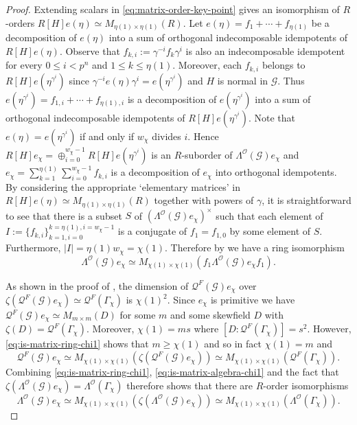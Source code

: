 \documentclass[12pt]{amsart}
\theoremstyle{plain}
\theoremstyle{remark}
\theoremstyle{definition}
\numberwithin{equation}{section}
\begin{document}
\begin{proof}
Extending scalars in \eqref{eq:matrix-order-key-point} gives an isomorphism of $R$-orders $R[H]e(\eta) \simeq M_{\eta(1) \times \eta(1)}(R)$.
Let $e(\eta) = f_{1} + \cdots + f_{\eta(1)}$ be a decomposition of $e(\eta)$
into a sum of orthogonal indecomposable idempotents of $R[H]e(\eta)$.
Observe that $f_{k,i}:=\gamma^{-i}f_{k}\gamma^{i}$ is also an indecomposable idempotent
for every $0 \leq i < p^{n}$ and $1 \leq k \leq \eta(1)$.
Moreover, each $f_{k,i}$ belongs to $R[H]e(\eta^{\gamma^{i}})$ since
$\gamma^{-i}e(\eta)\gamma^{i}=e(\eta^{\gamma^{i}})$ and $H$ is normal in $\mathcal{G}$.
Thus $e(\eta^{\gamma^{i}}) = f_{1,i} + \cdots + f_{\eta(1),i}$ is a decomposition of $e(\eta^{\gamma^{i}})$
into a sum of orthogonal indecomposable idempotents of $R[H]e(\eta^{\gamma^{i}})$.
Note that $e(\eta) = e(\eta^{\gamma^{i}})$ if and only if  $w_{\chi}$ divides $i$.
Hence $R[H]e_{\chi} = \oplus_{i=0}^{w_{\chi}-1} R[H] e(\eta^{\gamma^{i}})$ is an $R$-suborder of
$\Lambda^{\mathcal{O}}(\mathcal{G})e_{\chi}$ and $e_{\chi} = \sum_{k=1}^{\eta(1)} \sum_{i=0}^{w_{\chi}-1} f_{k,i}$
is a decomposition of $e_{\chi}$ into orthogonal idempotents.
By considering the appropriate `elementary matrices' in $R[H]e(\eta) \simeq  M_{\eta(1) \times \eta(1)}(R)$
together with powers of $\gamma$, it is straightforward to see that there is a subset $S$ of
$(\Lambda^{\mathcal{O}}(\mathcal{G})e_{\chi})^{\times}$
such that each element of $I:=\{ f_{k,i} \}_{k=1,i=0}^{k=\eta(1), i=w_{\chi}-1}$ is a conjugate of $f_{1}=f_{1,0}$
by some element of $S$. Furthermore, $|I|=\eta(1)w_{\chi}=\chi(1)$.
Therefore by \cite[\S 46, Exercise 2]{MR892316} we have a ring isomorphism
\begin{equation}\label{eq:is-matrix-ring-chi1}
\Lambda^{\mathcal{O}}(\mathcal{G})e_{\chi} \simeq M_{\chi(1) \times \chi(1)}(f_{1}\Lambda^{\mathcal{O}}(\mathcal{G})e_{\chi}f_{1}).
\end{equation}

As shown in the proof of \cite[Proposition 6 (2)]{MR2114937},
the dimension of $\mathcal{Q}^{F}(\mathcal{G})e_{\chi}$ over
$\zeta(\mathcal{Q}^{F}(\mathcal{G})e_{\chi}) \simeq \mathcal{Q}^{F}(\Gamma_{\chi})$ is $\chi(1)^{2}$.
Since $e_{\chi}$ is primitive we have $\mathcal{Q}^{F}(\mathcal{G})e_{\chi} \simeq M_{m \times m}(D)$ for some $m$ and some skewfield $D$
with $\zeta(D)=\mathcal{Q}^{F}(\Gamma_{\chi})$.
Moreover, $\chi(1)=ms$ where $[D: \mathcal{Q}^{F}(\Gamma_{\chi})]=s^{2}$.
However, \eqref{eq:is-matrix-ring-chi1} shows that $m \geq \chi(1)$ and so in fact $\chi(1)=m$
and
\begin{equation}\label{eq:is-matrix-algebra-chi1}
\mathcal{Q}^{F}(\mathcal{G})e_{\chi} \simeq M_{\chi(1) \times \chi(1)}(\zeta(\mathcal{Q}^{F}(\mathcal{G})e_{\chi})) \simeq M_{\chi(1) \times \chi(1)}(\mathcal{Q}^{F}(\Gamma_{\chi})).
\end{equation}
Combining \eqref{eq:is-matrix-ring-chi1}, \eqref{eq:is-matrix-algebra-chi1} and the fact that
$\zeta(\Lambda^{\mathcal{O}}(\mathcal{G})e_{\chi}) = \Lambda^{\mathcal{O}}(\Gamma_{\chi})$
therefore shows that there are $R$-order isomorphisms
\[
\Lambda^{\mathcal{O}}(\mathcal{G})e_{\chi} \simeq M_{\chi(1) \times \chi(1)}(\zeta(\Lambda^{\mathcal{O}}(\mathcal{G})e_{\chi}))
\simeq M_{\chi(1) \times \chi(1)}(\Lambda^{\mathcal{O}}(\Gamma_{\chi})).
\]


\end{proof}
\end{document}
